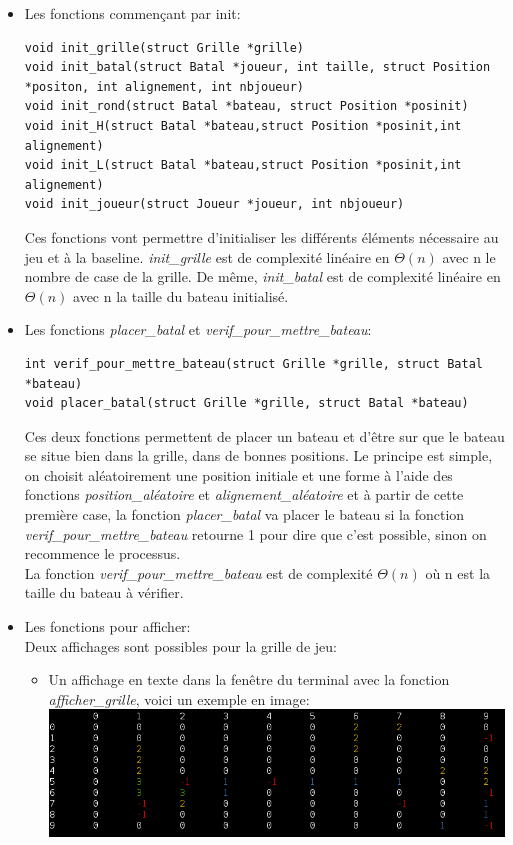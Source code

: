 \begin{itemize}

\item Les fonctions commençant par init:
\begin{lstlisting} 
void init_grille(struct Grille *grille)
void init_batal(struct Batal *joueur, int taille, struct Position *positon, int alignement, int nbjoueur)
void init_rond(struct Batal *bateau, struct Position *posinit)
void init_H(struct Batal *bateau,struct Position *posinit,int alignement)
void init_L(struct Batal *bateau,struct Position *posinit,int alignement)
void init_joueur(struct Joueur *joueur, int nbjoueur)
\end{lstlisting}
Ces fonctions vont permettre d'initialiser les différents éléments nécessaire au jeu et à la baseline. \textit{init\_grille} est de complexité linéaire en $\Theta(n)$ avec n le nombre de case de la grille. De même, \textit{init\_batal} est de complexité linéaire en $\Theta(n)$ avec n la taille du bateau initialisé.\\

\item Les fonctions \textit{placer\_batal} et \textit{verif\_pour\_mettre\_bateau}:
\begin{lstlisting} 
int verif_pour_mettre_bateau(struct Grille *grille, struct Batal *bateau)
void placer_batal(struct Grille *grille, struct Batal *bateau)
\end{lstlisting}
Ces deux fonctions permettent de placer un bateau et d'être sur que le bateau se situe bien dans la grille, dans de bonnes positions. Le principe est simple, on choisit aléatoirement une position initiale et une forme à l'aide des fonctions \textit{position\_aléatoire} et \textit{alignement\_aléatoire} et à partir de cette première case, la fonction \textit{placer\_batal} va placer le bateau si la fonction \textit{verif\_pour\_mettre\_bateau} retourne 1 pour dire que c'est possible, sinon on recommence le processus.\\
La fonction \textit{verif\_pour\_mettre\_bateau} est de complexité $\Theta(n)$ où n est la taille du bateau à vérifier.\\
\item Les fonctions pour afficher:\\
Deux affichages sont possibles pour la grille de jeu:
\begin{itemize}
\item Un affichage en texte dans la fenêtre du terminal avec la fonction \textit{afficher\_grille}, voici un exemple en image:\\
\includegraphics[scale=0.7]{image/grille_console.png}


\end{itemize}
\end{itemize}
